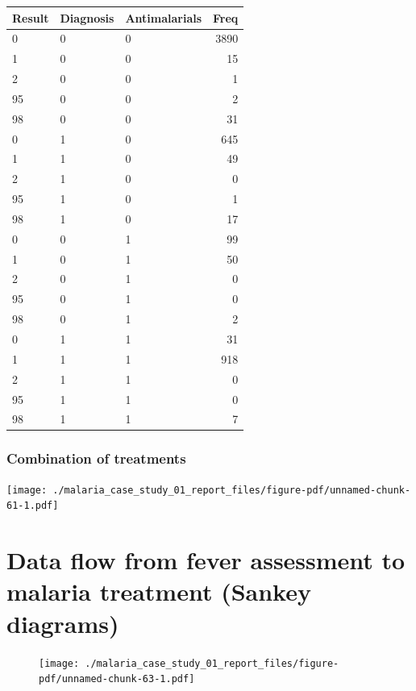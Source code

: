 \documentclass[
  letterpaper,
  DIV=11,
  numbers=noendperiod,
  oneside]{scrreprt}
\begin{document}
\begin{longtable}[]{@{}lllr@{}}
\toprule()
Result & Diagnosis & Antimalarials & Freq \\
\midrule()
\endhead
0 & 0 & 0 & 3890 \\
1 & 0 & 0 & 15 \\
2 & 0 & 0 & 1 \\
95 & 0 & 0 & 2 \\
98 & 0 & 0 & 31 \\
0 & 1 & 0 & 645 \\
1 & 1 & 0 & 49 \\
2 & 1 & 0 & 0 \\
95 & 1 & 0 & 1 \\
98 & 1 & 0 & 17 \\
0 & 0 & 1 & 99 \\
1 & 0 & 1 & 50 \\
2 & 0 & 1 & 0 \\
95 & 0 & 1 & 0 \\
98 & 0 & 1 & 2 \\
0 & 1 & 1 & 31 \\
1 & 1 & 1 & 918 \\
2 & 1 & 1 & 0 \\
95 & 1 & 1 & 0 \\
98 & 1 & 1 & 7 \\
\bottomrule()
\end{longtable}

\hypertarget{combination-of-treatments}{%
\subsubsection{Combination of
treatments}\label{combination-of-treatments}}

\texttt{[image: ./malaria\_case\_study\_01\_report\_files/figure-pdf/unnamed-chunk-61-1.pdf]}

\hypertarget{data-flow-from-fever-assessment-to-malaria-treatment-sankey-diagrams}{%
\section{Data flow from fever assessment to malaria treatment (Sankey
diagrams)}\label{data-flow-from-fever-assessment-to-malaria-treatment-sankey-diagrams}}

\begin{figure}

\texttt{[image: ./malaria\_case\_study\_01\_report\_files/figure-pdf/unnamed-chunk-63-1.pdf]}

\end{figure}
\end{document}
